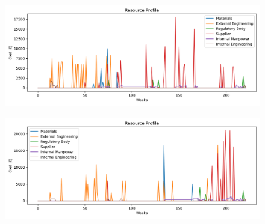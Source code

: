 \begin{figure}[p]
    \begin{minipage}{\textwidth}
        \centering
        \includegraphics[width=\textwidth]{../resource_profile_E.png}
        \label{fig:resource_profile_early}
    \end{minipage}\hfill
    \begin{minipage}{\textwidth}
        \centering
        \includegraphics[width=\textwidth]{../resource_profile_L.png}
        \label{fig:resource_profile_late}
    \end{minipage}
\end{figure}

